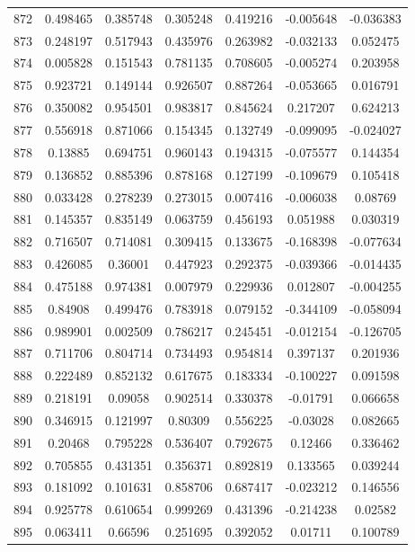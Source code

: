 \begin{table}
\begin{tabular}{c|c|c|c|c|c|c}
872 & 0.498465 & 0.385748 & 0.305248 & 0.419216 & -0.005648 & -0.036383\\
873 & 0.248197 & 0.517943 & 0.435976 & 0.263982 & -0.032133 & 0.052475\\
874 & 0.005828 & 0.151543 & 0.781135 & 0.708605 & -0.005274 & 0.203958\\
875 & 0.923721 & 0.149144 & 0.926507 & 0.887264 & -0.053665 & 0.016791\\
876 & 0.350082 & 0.954501 & 0.983817 & 0.845624 & 0.217207 & 0.624213\\
877 & 0.556918 & 0.871066 & 0.154345 & 0.132749 & -0.099095 & -0.024027\\
878 & 0.13885 & 0.694751 & 0.960143 & 0.194315 & -0.075577 & 0.144354\\
879 & 0.136852 & 0.885396 & 0.878168 & 0.127199 & -0.109679 & 0.105418\\
880 & 0.033428 & 0.278239 & 0.273015 & 0.007416 & -0.006038 & 0.08769\\
881 & 0.145357 & 0.835149 & 0.063759 & 0.456193 & 0.051988 & 0.030319\\
882 & 0.716507 & 0.714081 & 0.309415 & 0.133675 & -0.168398 & -0.077634\\
883 & 0.426085 & 0.36001 & 0.447923 & 0.292375 & -0.039366 & -0.014435\\
884 & 0.475188 & 0.974381 & 0.007979 & 0.229936 & 0.012807 & -0.004255\\
885 & 0.84908 & 0.499476 & 0.783918 & 0.079152 & -0.344109 & -0.058094\\
886 & 0.989901 & 0.002509 & 0.786217 & 0.245451 & -0.012154 & -0.126705\\
887 & 0.711706 & 0.804714 & 0.734493 & 0.954814 & 0.397137 & 0.201936\\
888 & 0.222489 & 0.852132 & 0.617675 & 0.183334 & -0.100227 & 0.091598\\
889 & 0.218191 & 0.09058 & 0.902514 & 0.330378 & -0.01791 & 0.066658\\
890 & 0.346915 & 0.121997 & 0.80309 & 0.556225 & -0.03028 & 0.082665\\
891 & 0.20468 & 0.795228 & 0.536407 & 0.792675 & 0.12466 & 0.336462\\
892 & 0.705855 & 0.431351 & 0.356371 & 0.892819 & 0.133565 & 0.039244\\
893 & 0.181092 & 0.101631 & 0.858706 & 0.687417 & -0.023212 & 0.146556\\
894 & 0.925778 & 0.610654 & 0.999269 & 0.431396 & -0.214238 & 0.02582\\
895 & 0.063411 & 0.66596 & 0.251695 & 0.392052 & 0.01711 & 0.100789\\

\end{tabular}
\end{table}
